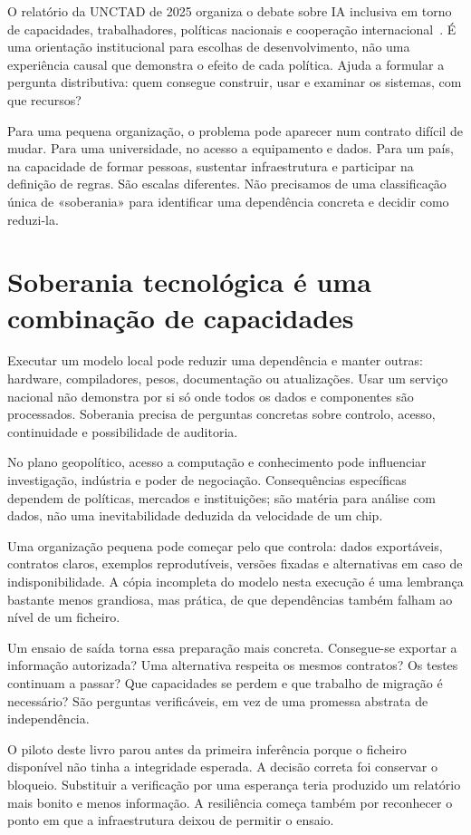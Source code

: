 O relatório da UNCTAD de 2025 organiza o debate sobre IA inclusiva em torno de capacidades, trabalhadores, políticas nacionais e cooperação internacional~\citep{unctad2025}. É uma orientação institucional para escolhas de desenvolvimento, não uma experiência causal que demonstra o efeito de cada política. Ajuda a formular a pergunta distributiva: quem consegue construir, usar e examinar os sistemas, com que recursos?

Para uma pequena organização, o problema pode aparecer num contrato difícil de mudar. Para uma universidade, no acesso a equipamento e dados. Para um país, na capacidade de formar pessoas, sustentar infraestrutura e participar na definição de regras. São escalas diferentes. Não precisamos de uma classificação única de «soberania» para identificar uma dependência concreta e decidir como reduzi-la.

\section{Soberania tecnológica é uma combinação de capacidades}
Executar um modelo local pode reduzir uma dependência e manter outras: hardware, compiladores, pesos, documentação ou atualizações. Usar um serviço nacional não demonstra por si só onde todos os dados e componentes são processados. Soberania precisa de perguntas concretas sobre controlo, acesso, continuidade e possibilidade de auditoria.

No plano geopolítico, acesso a computação e conhecimento pode influenciar investigação, indústria e poder de negociação. Consequências específicas dependem de políticas, mercados e instituições; são matéria para análise com dados, não uma inevitabilidade deduzida da velocidade de um chip.

Uma organização pequena pode começar pelo que controla: dados exportáveis, contratos claros, exemplos reprodutíveis, versões fixadas e alternativas em caso de indisponibilidade. A cópia incompleta do modelo nesta execução é uma lembrança bastante menos grandiosa, mas prática, de que dependências também falham ao nível de um ficheiro.

Um ensaio de saída torna essa preparação mais concreta. Consegue-se exportar a informação autorizada? Uma alternativa respeita os mesmos contratos? Os testes continuam a passar? Que capacidades se perdem e que trabalho de migração é necessário? São perguntas verificáveis, em vez de uma promessa abstrata de independência.

O piloto deste livro parou antes da primeira inferência porque o ficheiro disponível não tinha a integridade esperada. A decisão correta foi conservar o bloqueio. Substituir a verificação por uma esperança teria produzido um relatório mais bonito e menos informação. A resiliência começa também por reconhecer o ponto em que a infraestrutura deixou de permitir o ensaio.


